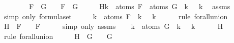 \begin{isabellebody}
\ \ \ \ \ \ {\isachardoublequoteopen}{\isasymA}\ {\isasymTurnstile}\ {\isacharparenleft}F\ \isactrlbold {\isasymor}\ G{\isacharparenright}\ {\isasymlongleftrightarrow}\ {\isasymA}\ {\isasymTurnstile}\ {\isacharparenleft}F\ \isactrlbold {\isasymor}\ G{\isacharparenright}{\isachardoublequoteclose}\isanewline
%
\isadelimproof
%
\endisadelimproof
%
\isatagproof
{}\isamarkupfalse%
\ {\isacharminus}\isanewline
\ \ \isamarkupfalse%
\ H{\isacharcolon}{\isachardoublequoteopen}{\isasymforall}k\ {\isasymin}\ atoms\ F\ {\isasymunion}\ atoms\ G{\isachardot}\ {\isasymA}\ k\ {\isacharequal}\ {\isasymA}\ k{\isachardoublequoteclose}\ \isamarkupfalse%
\ assms{\isacharparenleft}{}{\isacharparenright}\isanewline
\ \ \ \ \isamarkupfalse%
\ {\isacharparenleft}simp\ only{\isacharcolon}\ formula{\isachardot}set{\isacharparenleft}{}{\isacharparenright}{\isacharparenright}\isanewline
\ \ \isamarkupfalse%
\ \isamarkupfalse%
\ {\isachardoublequoteopen}{\isasymforall}k\ {\isasymin}\ atoms\ F{\isachardot}\ {\isasymA}\ k\ {\isacharequal}\ {\isasymA}\ k{\isachardoublequoteclose}\isanewline
\ \ \ \ \isamarkupfalse%
\ {\isacharparenleft}rule\ forall{\isacharunderscore}union{}{\isacharparenright}\isanewline
\ \ \isamarkupfalse%
\ \isamarkupfalse%
\ H{}{\isacharcolon}{\isachardoublequoteopen}{\isasymA}\ {\isasymTurnstile}\ F\ {\isasymlongleftrightarrow}\ {\isasymA}\ {\isasymTurnstile}\ F{\isachardoublequoteclose}\isanewline
\ \ \ \ \isamarkupfalse%
\ {\isacharparenleft}simp\ only{\isacharcolon}\ assms{\isacharparenleft}{}{\isacharparenright}{\isacharparenright}\isanewline
\ \ \isamarkupfalse%
\ {\isachardoublequoteopen}{\isasymforall}k\ {\isasymin}\ atoms\ G{\isachardot}\ {\isasymA}\ k\ {\isacharequal}\ {\isasymA}\ k{\isachardoublequoteclose}\isanewline
\ \ \ \ \isamarkupfalse%
\ H\ \isamarkupfalse%
\ {\isacharparenleft}rule\ forall{\isacharunderscore}union{}{\isacharparenright}\isanewline
\ \ \isamarkupfalse%
\ \isamarkupfalse%
\ H{}{\isacharcolon}{\isachardoublequoteopen}{\isasymA}\ {\isasymTurnstile}\ G\ {\isasymlongleftrightarrow}\ {\isasymA}\ {\isasymTurnstile}\ G{\isachardoublequoteclose}\isanewline

\end{isabellebody}
